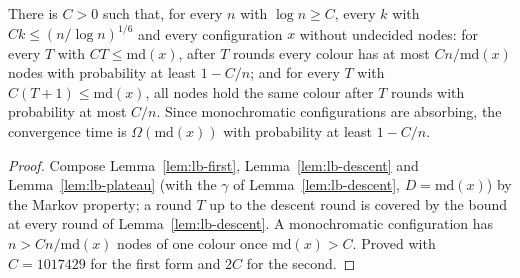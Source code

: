 \begin{theorem}\label{thm:lb}
\leanok{}
There is $C>0$ such that, for every $n$ with $\log n\ge C$, every $k$ with $Ck\le(n/\log n)^{1/6}$
and every configuration $x$ without undecided nodes: for every $T$ with $CT\le\mathrm{md}(x)$, after
$T$ rounds every colour has at most $Cn/\mathrm{md}(x)$ nodes with probability at least $1-C/n$; and
for every $T$ with $C(T+1)\le\mathrm{md}(x)$, all nodes hold the same colour after $T$ rounds with
probability at most $C/n$. Since monochromatic configurations are absorbing, the convergence time
is $\Omega(\mathrm{md}(x))$ with probability at least $1-C/n$.
\end{theorem}
\begin{proof}\leanok
Compose Lemma~\ref{lem:lb-first}, Lemma~\ref{lem:lb-descent} and Lemma~\ref{lem:lb-plateau}
(with the $\gamma$ of Lemma~\ref{lem:lb-descent}, $D=\mathrm{md}(x)$) by the Markov property; a
round $T$ up to the descent round is covered by the bound at every round of
Lemma~\ref{lem:lb-descent}. A monochromatic configuration has $n>Cn/\mathrm{md}(x)$ nodes of one
colour once $\mathrm{md}(x)>C$. Proved with $C=1017429$ for the first form and $2C$ for the second.
\end{proof}


